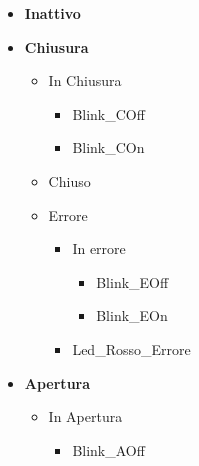             \begin{itemize}
                \item \textbf{Inattivo}
                    
                \item \textbf{Chiusura}  
                    \begin{itemize}    
                        \item In Chiusura  
                            \begin{itemize}
                                \item Blink\_COff
                                    
                                \item Blink\_COn
                            \end{itemize}
                        
                        \item Chiuso
                        
                        \item Errore
                            \begin{itemize}
                                \item In errore
                                    
                                    \begin{itemize}
                                        \item Blink\_EOff
                                            
                                        \item Blink\_EOn
                                    \end{itemize}
                                
                                \item Led\_Rosso\_Errore
                            \end{itemize}
                    \end{itemize}
                    
                \item \textbf{Apertura}
                    \begin{itemize}
                        \item In Apertura
                            \begin{itemize}
                                \item Blink\_AOff
                                    

\end{itemize}
\end{itemize}
\end{itemize}
